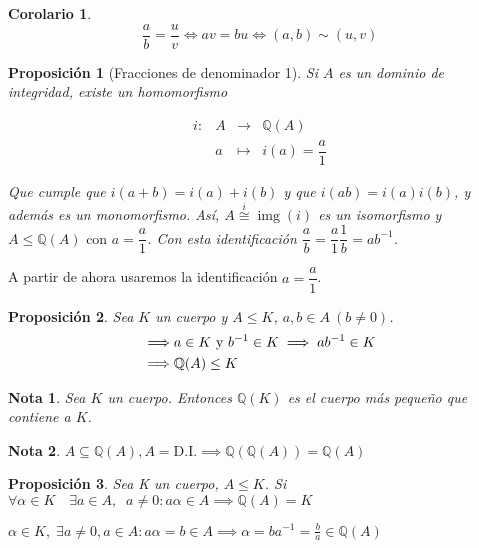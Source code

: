 \documentclass[11pt, a4paper, titlepage]{article}
\makeatletter
\newif\IfInSansMode
\let\oldsf\sffamily
\renewcommand*{\sffamily}{\oldsf\mathversion{sans}\InSansModetrue}
\let\oldnorm\normalfont
\renewcommand*{\normalfont}{\oldnorm\InSansModefalse\mathversion{normal}}
\renewenvironment{proof}[1][\proofname] {\vspace{-15pt}\par\pushQED{\qed}\normalfont\topsep6\p@\@plus6\p@\relax\trivlist\item[\hskip\labelsep\it#1\@addpunct{.}]\ignorespaces}{\popQED\endtrivlist\@endpefalse}
\providecommand{\rac}{\mathbb{Q}}
\DeclareMathOperator*{\img}{img}
\renewenvironment{proof}[1][\proofname] {\par\pushQED{\qed}\normalfont\topsep6\p@\@plus6\p@\relax\trivlist\item[\hskip\labelsep\itshape\sffamily#1\@addpunct{.}]\ignorespaces}{\popQED\endtrivlist\@endpefalse}
\theoremstyle{theorem-style}
\newtheorem{nprop}{Proposición}[section]
\newtheorem{ncor}{Corolario}[section]
\theoremstyle{definition-style}
\theoremstyle{remark-style}
\newtheorem*{nota}{Nota}
\theoremstyle{example-style}
\makeatother
\begin{document}
\begin{ncor}
	\[\frac{a}{b}= \frac{u}{v} \iff av = bu \iff (a,b) \sim (u,v)\]
\end{ncor}

\begin{nprop}[Fracciones de denominador 1]
  Si $A$ es un dominio de integridad, existe un homomorfismo

  \[
  \begin{array}{llll}
    i :& A & \longrightarrow & \mathbb{Q}(A) \\
       &a & \longmapsto &  i(a) = \dfrac{a}{1}
  \end{array}
  \]

  Que cumple que $i(a+b) = i(a)+i(b)$ y que $i(ab)=i(a)i(b)$, y además es un monomorfismo.
  Así, $A \stackrel{i}{\cong} \img(i)$ es un isomorfismo y $A\le\mathbb{Q}(A) \text{ con } a=\dfrac{a}{1}$.
  Con esta identificación $\dfrac{a}{b} = \dfrac{a}{1}\dfrac{1}{b} = ab^{-1}$.
\end{nprop}

A partir de ahora usaremos la identificación $a = \dfrac{a}{1}$.

\begin{nprop}
  Sea $K$ un cuerpo y $A\le K$, $a,b\in A\ (b\not=0)$.
  \begin{align}
    \implies& a\in K \text{ y } b^{-1}\in K \implies ab^{-1}\in K\notag\\
    \implies&\mathbb{Q}(A)\le K\notag
  \end{align}
\end{nprop}

\begin{nota}
 Sea $K$ un cuerpo. Entonces  $\mathbb{Q}(K)$ es el cuerpo más pequeño que contiene a $K$.
\end{nota}

\begin{nota}
  $A \subseteq \mathbb{Q}(A), A=\text{D.I.} \implies \rac(\rac(A)) = \rac(A)$
\end{nota}


\begin{nprop}
  Sea K un cuerpo, $A\le K$. Si $\forall\alpha\in K\quad \exists a\in A,\;\; a \not= 0 : a\alpha\in A \implies \rac(A)=K$
\end{nprop}

\begin{proof}
  $\alpha\in K,\; \exists a \ne 0, a\in A : a\alpha=b\in A \implies \alpha = ba^{-1} = \frac{b}{a}\in \rac(A)$
\end{proof}
\end{document}
